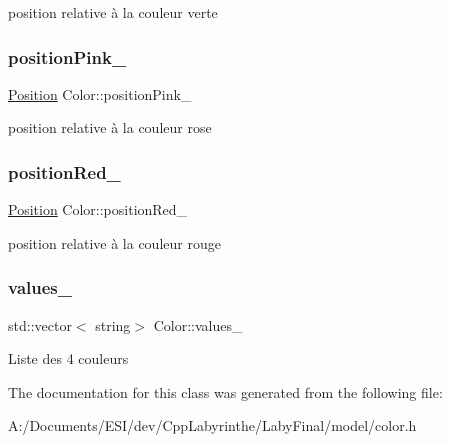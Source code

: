 position relative à la couleur verte \mbox{\label{class_color_a5c5373fae2631ba096a2b18a0680dcc0}} 
\subsubsection{\texorpdfstring{positionPink\_}{positionPink\_}}
{\footnotesize\ttfamily \mbox{\hyperlink{class_position}{Position}} Color\+::position\+Pink\+\_\+\hspace{0.3cm}{\ttfamily [private]}}

position relative à la couleur rose \mbox{\label{class_color_ae00f2413fff1249e37d0daad72ad12b0}} 
\subsubsection{\texorpdfstring{positionRed\_}{positionRed\_}}
{\footnotesize\ttfamily \mbox{\hyperlink{class_position}{Position}} Color\+::position\+Red\+\_\+\hspace{0.3cm}{\ttfamily [private]}}

position relative à la couleur rouge \mbox{\label{class_color_af6efd828cb7e03d6b4e92f2a0da7f981}} 
\subsubsection{\texorpdfstring{values\_}{values\_}}
{\footnotesize\ttfamily std\+::vector$<$ string$>$ Color\+::values\+\_\+\hspace{0.3cm}{\ttfamily [private]}}

Liste des 4 couleurs 

The documentation for this class was generated from the following file\+:\begin{DoxyCompactItemize}
\item 
A\+:/\+Documents/\+E\+S\+I/dev/\+Cpp\+Labyrinthe/\+Laby\+Final/model/color.\+h\end{DoxyCompactItemize}
